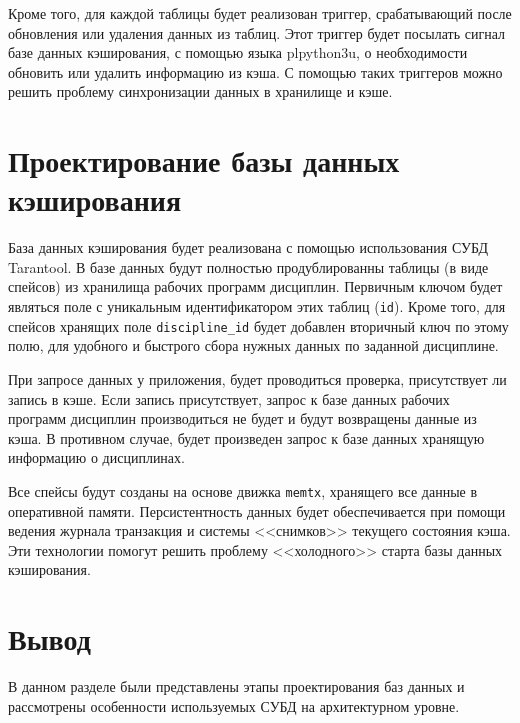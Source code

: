 Кроме того, для каждой таблицы будет реализован триггер, срабатывающий после обновления или удаления данных из таблиц. Этот триггер будет посылать сигнал базе данных кэширования, с помощью языка plpython3u, о необходимости обновить или удалить информацию из кэша. С помощью таких триггеров можно решить проблему синхронизации данных в хранилище и кэше.

\section{Проектирование базы данных кэширования}

База данных кэширования будет реализована с помощью использования СУБД Tarantool. В базе данных будут полностью продублированны таблицы (в виде спейсов) из хранилища рабочих программ дисциплин. Первичным ключом будет являться поле с уникальным идентификатором этих таблиц (\texttt{id}). Кроме того, для спейсов хранящих поле \texttt{discipline\_id} будет добавлен вторичный ключ по этому полю, для удобного и быстрого сбора нужных данных по заданной дисциплине.

При запросе данных у приложения, будет проводиться проверка, присутствует ли запись в кэше. Если запись присутствует, запрос к базе данных рабочих программ дисциплин производиться не будет и будут возвращены данные из кэша. В противном случае, будет произведен запрос к базе данных хранящую информацию о дисциплинах.

Все спейсы будут созданы на основе движка \texttt{memtx}, хранящего все данные в оперативной памяти. Персистентность данных будет обеспечивается при помощи ведения журнала транзакция и системы <<снимков>> текущего состояния кэша. Эти технологии помогут решить проблему <<холодного>> старта базы данных кэширования.

\section*{Вывод}

В данном разделе были представлены этапы проектирования баз данных и рассмотрены особенности используемых СУБД на архитектурном уровне.
